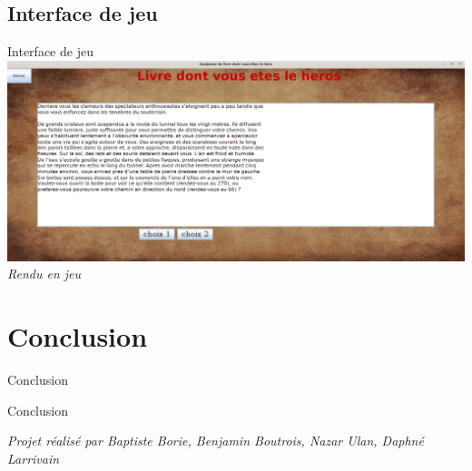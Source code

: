 \documentclass[aspectratio=169,xcolor=dvipsnames]{beamer}
\begin{document}
\subsection{Interface de jeu}
\begin{frame}{Interface de jeu}
       \centering
    \includegraphics[width=\textwidth]{imageJeu.png}{\small\textsl{\\Rendu en jeu}}
\end{frame}
\section{Conclusion}
\begin{frame}{Conclusion}
    \begin{center}
        \huge Conclusion  
    \end{center}
       {\small\textsl{Projet réalisé par Baptiste Borie, Benjamin Boutrois, Nazar Ulan, Daphné Larrivain }}
\end{frame}
\end{document}
